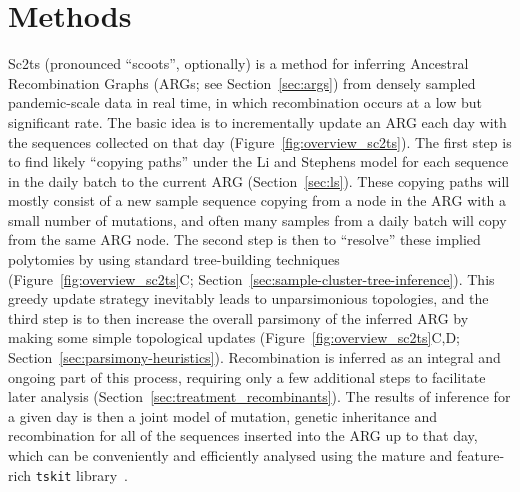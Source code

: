\documentclass{article}
\begin{document}

\section{Methods}
Sc2ts (pronounced ``scoots'', optionally) is a method for inferring
Ancestral Recombination Graphs (ARGs; see Section~\ref{sec:args})
from densely sampled pandemic-scale data
in real time, in which recombination occurs at a low but significant rate.
The basic idea is to incrementally update an ARG each day
with the sequences collected on that day (Figure~\ref{fig:overview_sc2ts}).
The first step is to find likely ``copying paths'' under the Li and Stephens model
for each sequence in the daily batch to the current ARG (Section~\ref{sec:ls}).
These copying paths
will mostly consist of a new sample sequence copying from a node in the ARG
with a small number of mutations, and often many samples
from a daily batch will copy from the same ARG node.
The second step is then to ``resolve'' these implied polytomies by using
standard tree-building techniques (Figure~\ref{fig:overview_sc2ts}C;
Section~\ref{sec:sample-cluster-tree-inference}).
This greedy update strategy inevitably leads to unparsimonious
topologies, and the third step is to then increase the
overall parsimony of the inferred ARG by making some simple topological
updates (Figure~\ref{fig:overview_sc2ts}C,D;
Section~\ref{sec:parsimony-heuristics}).
Recombination is inferred as an integral and ongoing part of this
process, requiring only a few additional steps to facilitate
later analysis (Section~\ref{sec:treatment_recombinants}).
The results of inference for a given day is then
a joint model of mutation, genetic inheritance and recombination
for all of the sequences inserted into the ARG up to that day,
which can be conveniently and efficiently analysed using the
mature and feature-rich
\texttt{tskit}
library~\citep{Kelleher2018-xc,Ralph2020-efficiently,Tskit2023-tskit}.
\end{document}
